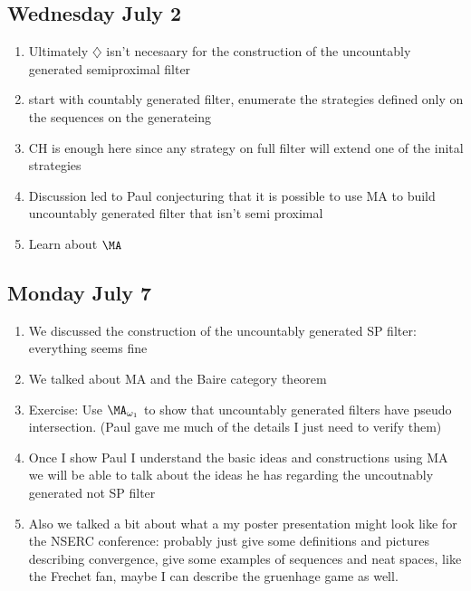 \documentclass{article}
\begin{document}
\subsection*{Wednesday July 2}
\begin{enumerate}
    \item Ultimately \(\diamondsuit\) isn't necesaary for the construction of the uncountably generated semiproximal filter
    \item start with countably generated filter, enumerate the strategies defined only on the sequences on the generateing 
    \item CH is enough here since any strategy on full filter will extend one of the inital strategies
    \item Discussion led to Paul conjecturing that it is possible to use MA to build uncountably generated filter that isn't semi proximal
    \item Learn about \(\MA\) \checkmark 
\end{enumerate}

\subsection*{Monday July 7}
\begin{enumerate}
    \item We discussed the construction of the uncountably generated SP filter: everything seems fine
    \item We talked about MA and the Baire category theorem
    \item Exercise: Use \(\MA_{\omega_1}\) to show that uncountably generated filters have pseudo intersection. (Paul gave me much of the details I just need to verify them)
    \item Once I show Paul I understand the basic ideas and constructions using MA we will be able to talk about the ideas he has regarding the uncoutnably generated not SP filter
    \item Also we talked a bit about what a my poster presentation might look like for the NSERC conference: probably just give some definitions and pictures describing convergence, give some examples of sequences and neat spaces, like the Frechet fan, maybe I can describe the gruenhage game as well.
\end{enumerate}
\end{document}
